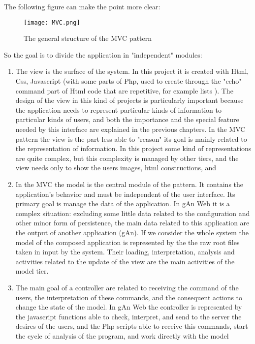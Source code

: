 The following figure can make the point more clear:

\begin{figure}[H]
\centering
\texttt{[image: MVC.png]}  
\caption{The general structure of the MVC pattern}
\end{figure}    

So the goal is to divide the application in "independent" modules:

\begin{enumerate}

\item The view is the surface of the system. In this project it is created with Html, Css, Javascript (with some parts of Php, used to create through the "echo" command part of Html code that are repetitive, for example lists ). The design of the view in this kind of projects is particularly important because the application needs to represent particular kinds of information to particular kinds of users, and both the importance and the special feature needed by this interface are explained in the previous chapters. In the MVC pattern the view is the part less able to "reason" its goal is mainly related to the representation of information. In this project some kind of representations are quite complex, but this complexity is managed by other tiers, and the view needs only to show the users images, html constructions, and 

\item In the MVC the model is the central module of the pattern. It contains the application's behavior and must be independent of the user interface. Its primary goal is manage the data of the application. In gAn Web it is a complex situation: excluding some little data related to the configuration and other minor form of persistence, the main data related to this application are the output of another application (gAn). If we consider the whole system the model of the composed application is represented by the the raw root files taken in input by the system. Their loading, interpretation, analysis and activities related to the update of the view are the main activities of the model tier.   

\item The main goal of a controller are related to receiving the command of the users, the interpretation of these commands, and the consequent actions to change the state of the model. In gAn Web the controller is represented by the javascript functions able to check, interpret, and send to the server the desires of the users, and the Php scripts able to receive this commands, start the cycle of analysis of the program, and work directly with the model 


\end{enumerate}
 
